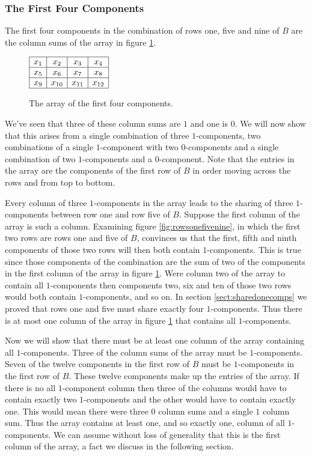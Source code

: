 \subsubsection{The First Four Components}
\label{sect:firstfourcomps}
The first four components in the combination of rows one, five and nine of $B$ are the column sums of the array in figure \ref{fig:firstfourcomps}.
\begin{figure}
\begin{center}
$\begin{array}{|c|c|c|c|}
	\hline
	 x_{ 1} & x_{ 2} & x_{ 3} & x_{ 4} \\
	\hline
	 x_{ 5} & x_{ 6} & x_{ 7} & x_{ 8} \\
	\hline
	 x_{ 9} & x_{10} & x_{11} & x_{12} \\
	\hline
\end{array}$
\caption{The array of the first four components.}
\label{fig:firstfourcomps}
\end{center}
\end{figure}
We've seen that three of these column sums are $1$ and one is $0$.
We will now show that this arises from a single combination of three $1$-components, two combinations of a single $1$-component with two $0$-components and a single combination of two $1$-components and a $0$-component.
Note that the entries in the array are the components of the first row of $B$ in order moving across the rows and from top to bottom.

Every column of three $1$-components in the array leads to the sharing of three $1$-components between row one and row five of $B$.
Suppose the first column of the array is such a column.
Examining figure \ref{fig:rowsonefivenine}, in which the first two rows are rows one and five of $B$, convinces us that the first, fifth and ninth components of those two rows will then both contain $1$-components.
This is true since those components of the combination are the sum of two of the components in the first column of the array in figure \ref{fig:firstfourcomps}.
Were column two of the array to contain all $1$-components then components two, six and ten of those two rows would both contain $1$-components, and so on.
In section \ref{sect:sharedonecomps} we proved that rows one and five must share exactly four $1$-components.
Thus there is at most one column of the array in figure \ref{fig:firstfourcomps} that contains all $1$-components.

Now we will show that there must be at least one column of the array containing all $1$-components.
Three of the column sums of the array must be $1$-components.
Seven of the twelve components in the first row of $B$ must be $1$-components in the first row of $B$.
These twelve components make up the entries of the array.
If there is no all $1$-component column then three of the columns would have to contain exactly two $1$-components and the other would have to contain exactly one.
This would mean there were three $0$ column sums and a single $1$ column sum.
Thus the array contains at least one, and so exactly one, column of all $1$-components.
We can assume without loss of generality that this is the first column of the array, a fact we discuss in the following section.


